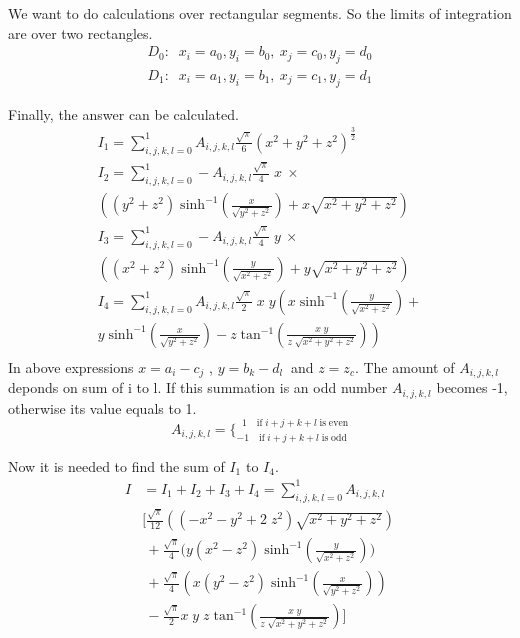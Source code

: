 \documentclass[final,5p,times,twocolumn]{elsarticle}
\begin{document}
We want to do calculations over rectangular segments. So the limits of integration are over two rectangles.
\begin{eqnarray}\label {eq14}
D_0:\;\;x_i=a_0, y_i = b_0,\ x_j = c_0,y_j = d_0\nonumber\\
D_1:\;\;x_i=a_1, y_i = b_1, \ x_j = c_1,y_j = d_1
\end{eqnarray}

Finally, the answer can be calculated.
\begin{equation}\label {eq15}
\begin{array}{lll}

I_1 = \sum_{i,j,k,l=0}^1 A_{i,j,k,l}\frac {\sqrt{\pi} } {6} (x^2+y^2+z^2)^{\frac 3 2}\\
I_2 = \sum_{i,j,k,l=0}^1 -A_{i,j,k,l}\frac {\sqrt{\pi} } {4}\;x\ \times \\
\left((y^2 + z^2) \;\mathrm{sinh^{-1}}(\frac{x}{\sqrt{y^2 + z^2}}) +x \sqrt{x^2 + y^2 + z^2}\right)\\ 
I_3 = \sum_{i,j,k,l=0}^1 -A_{i,j,k,l}\frac {\sqrt{\pi} } {4}\;y\ \times \\
\left((x^2 + z^2)\;\mathrm{sinh^{-1}}(\frac{y}{\sqrt{x^2 + z^2}}) +y \sqrt{x^2 + y^2 + z^2}\right) \\ 
I_4 = \sum_{i,j,k,l=0}^1 A_{i,j,k,l}\frac {\sqrt{\pi} } {2}\;x\;y \left(x\;\mathrm{sinh^{-1}}(\frac{y}{\sqrt{x^2 + z^2}})+ \right.\\
\left. y\;\mathrm{sinh^{-1}}(\frac{x}{\sqrt{y^2 + z^2}}) -z\;\mathrm{tan^{-1}}(\frac{x\;y}{z\;\sqrt{x^2+y^2 + z^2}}) \right)\\ 

\end{array}
\end{equation}
In above expressions $x = a_i - c_j$ , $y = b_k - d_l\ $ and $z = z_c$. The amount of $A_{i,j,k,l}$ deponds on sum of i to l. If this summation is an odd number $A_{i,j,k,l}$ becomes -1, otherwise its value equals to 1.
\begin{equation}\label{eq16}
A_{i,j,k,l} = \Big\{^{\;\;1\quad  \mathrm{if}\; i + j + k + l\; \mathrm{is \;even}}_{-1\quad  \mathrm{if}\; i + j + k + l\; \mathrm{is \;odd}}
\end{equation}

Now it is needed to find the sum of $I_1$ to $I_4$.
\begin{equation}\label {eq:17}
\begin{array}{ll}
I&=I_1+I_2+I_3+I_4 = \sum_{i,j,k,l=0}^1 A_{i,j,k,l}\\
&  \bigg[ \frac {\sqrt{\pi} } {12} \left((-x^2-y^2+2\;z^2)\sqrt{x^2 + y^2 + z^2} \right) \\

& \ +  \frac {\sqrt{\pi} } {4} \bigg( y(x^2 - z^2)\;\mathrm{sinh^{-1}}(\frac{y}{\sqrt{x^2 + z^2}}) \bigg)\\
&\ +   \frac {\sqrt{\pi} } {4}\left( x(y^2-z^2)\;\mathrm{sinh^{-1}}(\frac{x}{\sqrt{y^2 + z^2}})  \right)\\ 
&\ -  \frac {\sqrt{\pi} } {2}x \;y\;z\;\mathrm{tan^{-1}}(\frac{x\;y}{z\;\sqrt{x^2+y^2 + z^2}})\bigg]

\end{array}
\end{equation}
\end{document}
